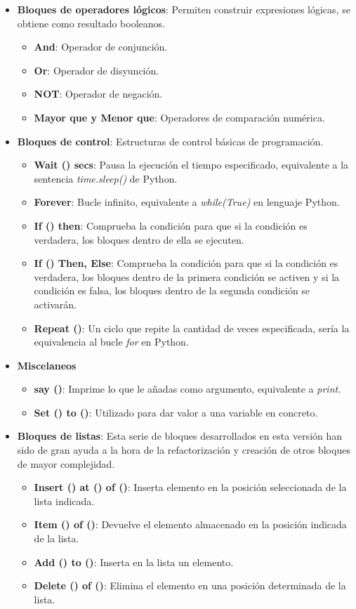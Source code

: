\begin{itemize}
\item \textbf{Bloques de operadores lógicos}:
Permiten construir expresiones lógicas, se obtiene como resultado booleanos.
\begin{itemize}

 \item \textbf{And}: Operador de conjunción.
 \item \textbf{Or}: Operador de disyunción.
 \item \textbf{NOT}: Operador de negación.
 \item \textbf{Mayor que y Menor que}: Operadores de comparación numérica.
\end{itemize}

\item \textbf{Bloques de control}:
Estructuras de control básicas de programación.
\begin{itemize}
\item \textbf{Wait () secs}: Pausa la ejecución el tiempo especificado, equivalente a la sentencia \textit{time.sleep()} de Python.
\item \textbf{Forever}: Bucle infinito, equivalente a \textit{while(True)} en lenguaje Python.
\item \textbf{If () then}: Comprueba la condición para que si la condición es verdadera, los bloques dentro de ella se ejecuten.
\item \textbf{If () Then, Else}: Comprueba la condición para que si la condición es verdadera, los bloques dentro de la primera condición se activen y si la condición es falsa, los bloques dentro de la segunda condición se activarán.
\item \textbf{Repeat ()}: Un ciclo que repite la cantidad de veces especificada, sería la equivalencia al bucle \textit{for} en Python.
\end{itemize}
\item \textbf{Miscelaneos}
\begin{itemize}

\item \textbf{say ()}: Imprime lo que le añadas como argumento, equivalente a \textit{print}.
\item \textbf{Set () to ()}: Utilizado para dar valor a una variable en concreto.
\end{itemize}

\item \textbf{Bloques de listas}:
Esta serie de bloques desarrollados en esta versión han sido de gran ayuda a la hora de la refactorización y creación de otros bloques de mayor complejidad.
\begin{itemize}
\item \textbf{Insert () at () of ()}: Inserta elemento en la posición seleccionada de la lista indicada.
\item \textbf{Item () of ()}: Devuelve el elemento almacenado en la posición indicada de la lista.
\item \textbf{Add () to ()}: Inserta en la lista un elemento.
\item \textbf{Delete () of ()}: Elimina el elemento en una posición determinada de la lista.
\end{itemize}
\end{itemize}

